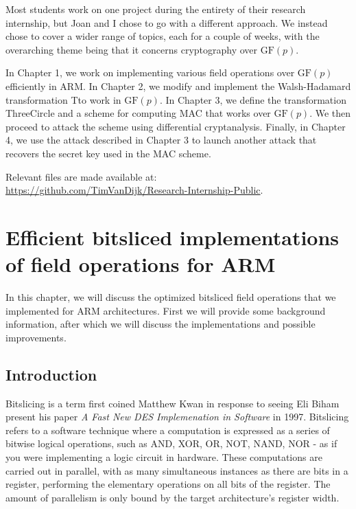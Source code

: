 \documentclass{report}
\newcommand{\GF}{\text{GF}}
\newcommand{\ThreeCircle}{{\sc ThreeCircle} }
\begin{document}
Most students work on one project during the entirety of their research internship, but Joan and I chose to go with a different approach.
We instead chose to cover a wider range of topics, each for a couple of weeks, with the overarching theme being that it concerns cryptography over $\GF(p)$.

In Chapter 1, we work on implementing various field operations over $\GF(p)$ efficiently in ARM. In Chapter 2, we modify and implement the Walsh-Hadamard transformation Tto work in $\GF(p)$. In Chapter 3, we define the transformation \ThreeCircle and a scheme for computing MAC that works over $\GF(p)$. We then proceed to attack the scheme using differential cryptanalysis. Finally, in Chapter 4, we use the attack described in Chapter 3 to launch another attack that recovers the secret key used in the MAC scheme.

Relevant files are made available at:\\\url{https://github.com/TimVanDijk/Research-Internship-Public}.


\chapter{Efficient bitsliced implementations of field operations for ARM}

In this chapter, we will discuss the optimized bitsliced field operations that we implemented for ARM architectures. First we will provide some background information, after which we will discuss the implementations and possible improvements.

\section{Introduction}
Bitslicing is a term first coined Matthew Kwan in response to seeing Eli Biham present his paper \textit{A Fast New DES Implemenation in Software} in 1997.\cite{kwan1998bitslice}
Bitslicing refers to a software technique where a computation is expressed as a series of bitwise logical operations, such as AND, XOR, OR, NOT, NAND, NOR - as if you were implementing a logic circuit in hardware.
These computations are carried out in parallel, with as many simultaneous instances as there are bits in a register, performing the elementary operations on all bits of the register. The amount of parallelism is only bound by the target architecture's register width.
\end{document}
